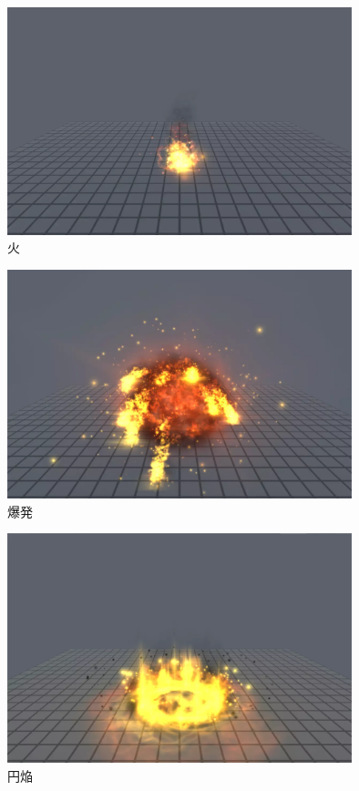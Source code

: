 \begin{figure}[h]
\centering
\includegraphics[clip,width=10cm]{./fig/firefire.png}
\caption{火}\label{fire}
\end{figure}

\begin{figure}[h]
\centering
\includegraphics[clip,width=10cm]{./fig/explosion.png}
\caption{爆発}\label{explosion}
\end{figure}

\begin{figure}[h]
\centering
\includegraphics[clip,width=10cm]{./fig/ringfire.png}
\caption{円焔}\label{ringfire}
\end{figure}

